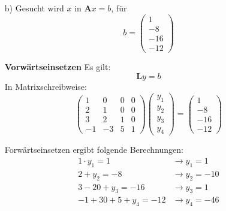 \documentclass[11pt]{article}
\theoremstyle{plain}
\theoremstyle{definition}
\let\mbb\boldsymbol
\renewcommand\boldsymbol{\mbb}
\renewcommand{\a}{\"{a}}
\renewcommand{\u}{\"{u}}
\begin{document}
\begin{itemize}
F\u hrt man alle Schritte aus, so kommt man auf:
\begin{align*}
\mbb{L} =
\begin{pmatrix}
 1 & 0 & 0 & 0 \\
 2 & 1 & 0 & 0 \\
 3 & 2 & 1 & 0 \\
-1 & -3 & 5 & 1 \\
\end{pmatrix} 
\quad
\mbb{R} =
\begin{pmatrix}
2  & -1 & -3 & 3   \\
0  &  2 &  3 & -5  \\
0  &  0 &  2 &  7  \\
0  &  0 &  0 & -46 \\
\end{pmatrix}
\end{align*}    

\item[b)]
Gesucht wird $x$ in $\mbb{A}x=b$, f\u r
\begin{equation}
b = 
\begin{pmatrix}
1 \\ -8 \\ -16 \\ -12
\end{pmatrix}
\end{equation}


\textbf{Vorw\a rtseinsetzen}
Es gilt:
\begin{equation}
\mbb{L}y=b
\end{equation}
In Matrixschreibweise:
\begin{equation}
\begin{pmatrix}
1 & 0 & 0 & 0 \\
2 & 1 & 0 & 0 \\
3 & 2 & 1 & 0 \\
-1& -3& 5 & 1
\end{pmatrix}
\begin{pmatrix}
y_1 \\ y_2 \\ y_3 \\ y_4
\end{pmatrix}
=
\begin{pmatrix}
1 \\ -8 \\ -16 \\ -12
\end{pmatrix}
\end{equation}

Forw\a rtseinsetzen ergibt folgende Berechnungen:
\begin{align}
1 \cdot y_1 = 1   &\rightarrow y_1 = 1 \\
2 + y_2 = -8      &\rightarrow y_2=-10 \\
3-20+y_3 =-16     &\rightarrow y_3 = 1 \\
-1+30+5+y_4 = -12 &\rightarrow y_4 = -46 \\
\end{align}
 

\end{itemize}
\end{document}
